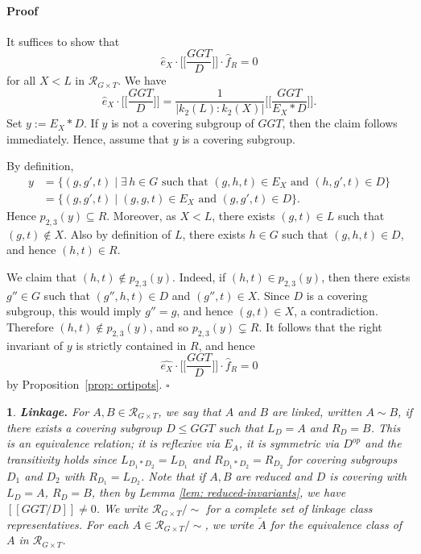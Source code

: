 \documentclass[12pt]{article}
\theoremstyle{change}
\newtheorem{nothing}[theorem]{}
\newenvironment{proof}{\paragraph{Proof}}{\hfill$\square$}
\newcommand{\calR}{\mathcal{R}}
\newcommand{\1}{{\bf 1}}
\begin{document}
\begin{proof}
It suffices to show that
\[
\widehat{e}_X\cdot \Big[\Big[\frac{GGT}{D}\Big]\Big] \cdot \widehat{f}_R = 0
\]
for all $X < L$ in $\calR_{G\times T}$. We have
\[
\widehat{e}_X\cdot \Big[\Big[\frac{GGT}{D}\Big]\Big]
= \frac{1}{|k_2(L):k_2(X)|}\Big[\Big[\frac{GGT}{E_X * D}\Big]\Big].
\]
Set $y := E_X * D$. If $y$ is not a covering subgroup of $GGT$, then the claim follows immediately. Hence, assume that $y$ is a covering subgroup.

By definition,
\begin{align*}
y &= \{(g,g',t)\mid \exists\, h \in G \text{ such that } (g,h,t)\in E_X \text{ and } (h,g',t)\in D\} \\
  &= \{(g,g',t)\mid (g,g,t)\in E_X \text{ and } (g,g',t)\in D\}.
\end{align*}
Hence $p_{2,3}(y)\subseteq R$. Moreover, as $X < L$, there exists $(g,t)\in L$ such that $(g,t)\notin X$. Also by definition of $L$, there exists $h \in G$ such that $(g,h,t)\in D$, and hence $(h,t)\in R$. 

We claim that $(h,t)\notin p_{2,3}(y)$. Indeed, if $(h,t)\in p_{2,3}(y)$, then there exists $g''\in G$ such that $(g'',h,t)\in D$ and $(g'',t)\in X$. Since $D$ is a covering subgroup, this would imply $g''=g$, and hence $(g,t)\in X$, a contradiction. Therefore $(h,t)\notin p_{2,3}(y)$, and so $p_{2,3}(y) \subsetneq R$.
It follows that the right invariant of $y$ is strictly contained in $R$, and hence
\[
\widehat{e_X}\cdot \Big[\Big[\frac{GGT}{D}\Big]\Big] \cdot \widehat{f}_R = 0
\]
by Proposition~\ref{prop: ortipots}.
\end{proof}\begin{nothing}
\textbf{Linkage.} For $A,B \in \calR_{G\times T}$, we say that $A$ and $B$ are \emph{linked}, written $A\sim B$, if there exists a covering subgroup $D \leq GGT$ such that $L_D = A$ and $R_D = B$. This is an equivalence relation; it is reflexive via $E_A$, it is symmetric via $D^{op}$ and the transitivity holds since $L_{D_1\ast D_2} = L_{D_1}$ and $R_{D_1\ast D_2} = R_{D_2}$ for covering subgroups $D_1$ and $D_2$ with $R_{D_1} = L_{D_2}$. Note that if $A, B$ are reduced and $D$ is covering with $L_D = A$, $R_D = B$, then by Lemma \ref{lem: reduced-invariants}, we have $[[GGT/D]]\neq 0$. We write $\calR_{G\times T}/\sim$ for a complete set of linkage class representatives. For each $A \in \calR_{G\times T}/\sim$, we write $\widetilde{A}$ for the equivalence class of $A$ in $\calR_{G\times T}$.
\end{nothing}
\end{document}
